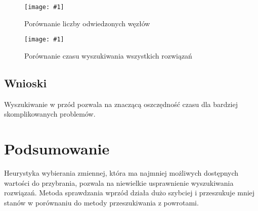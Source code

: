 \documentclass[12pt,a4paper]{article}
\newcommand{\image}[2] {
    \begin{figure}[H]
        \begin{center}
            \texttt{[image: \#1]}
        \end{center}
        \caption{#2}
        \label{#1}
    \end{figure}
}
\begin{document}
\image{Arkusz1_1}{Porównanie liczby odwiedzonych węzłów}
\image{Arkusz1_2}{Porównanie czasu wyszukiwania wszystkich rozwiązań}
\subsection{Wnioski}
Wyszukiwanie w przód pozwala na znaczącą oszczędność czasu dla bardziej skomplikowanych problemów.





\newpage
\section{Podsumowanie}
Heurystyka wybierania zmiennej, która ma najmniej możliwych dostępnych wartości do przybrania, pozwala na niewielkie usprawnienie wyszukiwania rozwiązań.
Metoda sprawdzania wprzód działa dużo szybciej i przeszukuje mniej stanów w porównaniu do metody przeszukiwania z powrotami.

\end{document}
